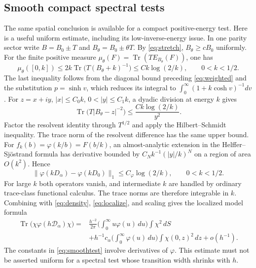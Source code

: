 \documentclass[11pt]{amsart}
\numberwithin{equation}{section}
\theoremstyle{remark}
\newcommand{\Tr}{\operatorname{Tr}}
\newcommand{\Dcal}{\mathcal{D}}
\begin{document}
\subsection{Smooth compact spectral tests}
The same spatial conclusion is available for a compact positive-energy test. Here is a useful uniform estimate, including its low-inverse-energy issue. In one parity sector write $B=B_0\pm T$ and $B_\theta=B_0\pm\theta T$. By \eqref{eq:stretch}, $B_\theta\ge cB_0$ uniformly. For the finite positive measure $\mu_\theta(F)=\Tr(TE_{B_\theta}(F))$, one has
\begin{equation}\label{eq:mutheta}
\mu_\theta([0,k])\le2k\Tr\big(T(B_\theta+k)^{-1}\big)\le Ck\log(2/k),\qquad 0<k<1/2 .
\end{equation}
The last inequality follows from the diagonal bound preceding \eqref{eq:weighted} and the substitution $p=\sinh v$, which reduces its integral to $\int_0^\infty(1+k\cosh v)^{-1}dv$. For $z=x+iy$, $|x|\le C_0k$, $0<|y|\le C_1k$, a dyadic division at energy $k$ gives
\begin{equation}\label{eq:resolventbound}
\Tr\big(T|B_\theta-z|^{-2}\big)\le\frac{Ck\log(2/k)}{y^2} .
\end{equation}
Factor the resolvent identity through $T^{1/2}$ and apply the Hilbert--Schmidt inequality. The trace norm of the resolvent difference has the same upper bound. For $f_k(b)=\varphi(k/b)=F(b/k)$, an almost-analytic extension in the Helffer--Sj\"ostrand formula has derivative bounded by $C_Nk^{-1}(|y|/k)^N$ on a region of area $O(k^2)$. Hence
\begin{equation}\label{eq:smoothtest}
\|\varphi(kD_\alpha)-\varphi(kD_0)\|_1\le C_\varphi\log(2/k),\qquad 0<k<1/2 .
\end{equation}
For large $k$ both operators vanish, and intermediate $k$ are handled by ordinary trace-class functional calculus. The trace norms are therefore integrable in $k$. Combining with \eqref{eq:density}, \eqref{eq:localize}, and scaling gives the localized model formula
\begin{equation}\label{eq:localtest}
\begin{aligned}
\Tr\big(\chi\varphi(h\Dcal_\alpha)\chi\big)={}&\frac{h^{-2}}{2\pi}\Big(\int_0^\infty u\varphi(u)\,du\Big)\int\chi^2\,dS\\
&+h^{-1}c_\alpha\Big(\int_0^\infty\varphi(u)\,du\Big)\int\chi(0,z)^2\,dz+o(h^{-1}) .
\end{aligned}
\end{equation}
The constants in \eqref{eq:smoothtest} involve derivatives of $\varphi$. This estimate must not be asserted uniform for a spectral test whose transition width shrinks with $h$.
\end{document}
